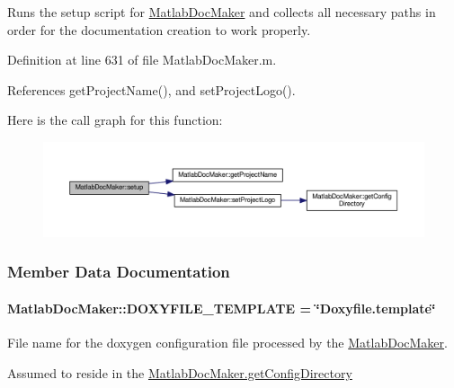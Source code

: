 Runs the setup script for \hyperlink{class_matlab_doc_maker}{Matlab\+Doc\+Maker} and collects all necessary paths in order for the documentation creation to work properly. 



Definition at line 631 of file Matlab\+Doc\+Maker.\+m.



References get\+Project\+Name(), and set\+Project\+Logo().

Here is the call graph for this function\+:
\nopagebreak
\begin{figure}[H]
\begin{center}
\leavevmode
\includegraphics[width=350pt]{class_matlab_doc_maker_a434c176c2421dd18a40003919b19f4f2_cgraph}
\end{center}
\end{figure}


\subsubsection{Member Data Documentation}
\paragraph[{\texorpdfstring{D\+O\+X\+Y\+F\+I\+L\+E\+\_\+\+T\+E\+M\+P\+L\+A\+TE}{DOXYFILE\_TEMPLATE}}]{\setlength{\rightskip}{0pt plus 5cm}Matlab\+Doc\+Maker\+::\+D\+O\+X\+Y\+F\+I\+L\+E\+\_\+\+T\+E\+M\+P\+L\+A\+TE = \char`\"{}Doxyfile.\+template\char`\"{}\hspace{0.3cm}{\ttfamily [static]}}\hypertarget{class_matlab_doc_maker_ab9514d0ba074c3b92a7fae2b50846b90}{}\label{class_matlab_doc_maker_ab9514d0ba074c3b92a7fae2b50846b90}


File name for the doxygen configuration file processed by the \hyperlink{class_matlab_doc_maker}{Matlab\+Doc\+Maker}. 

Assumed to reside in the \hyperlink{class_matlab_doc_maker_a11a2a8ec616df969a911b325e39b0b4f}{Matlab\+Doc\+Maker.\+get\+Config\+Directory}

